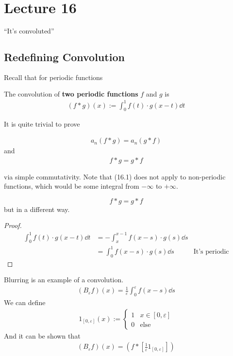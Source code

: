 \section{Lecture 16}
``It's convoluted''
\subsection{Redefining Convolution}
Recall that for periodic functions
\begin{definition}
    The convolution of \textbf{two periodic functions} $f$ and $g$ is
    \begin{align}
        (f * g)(x) := \int_0^1 f(t)\cdot g(x-t) \dd{t}
    \end{align}
\end{definition}
It is quite trivial to prove
\begin{lemma}
    \begin{align}
        a_n(f * g) = a_n(g * f)
    \end{align}
    and
    \begin{align}
        f*g = g*f
    \end{align}
\end{lemma}
via simple commutativity. Note that (16.1) does not apply to non-periodic functions, which would be some integral from $-\infty$ to $+\infty$.
\begin{lemma}
    $$f*g = g*f$$
    but in a different way.
\end{lemma}
\begin{proof}
    \begin{align}
        \int_0^1 f(t)\cdot g(x-t) \dd{t} &= -\int_x^{x-1} f(x-s)\cdot g(s) \dd{s}\\
        &= \int_0^1 f(x-s)\cdot g(s) \dd{s} & \text{It's periodic}
    \end{align}
\end{proof}
\noindent Blurring is an example of a convolution.
\begin{align}
    (B_\varepsilon f)(x) = \frac{1}{\varepsilon} \int_0^\varepsilon f(x - s) \dd{s}
\end{align}
We can define
\begin{align}
    1_{[0,\varepsilon]}(x) := \begin{cases}
        1 & x \in [0, \varepsilon]\\
        0 & \text{else}
    \end{cases}
\end{align}
And it can be shown that
\begin{align}
    (B_\varepsilon f)(x) = \left(f * \left[ \frac{1}{\varepsilon} 1_{[0,\varepsilon]} \right]\right)
\end{align}

